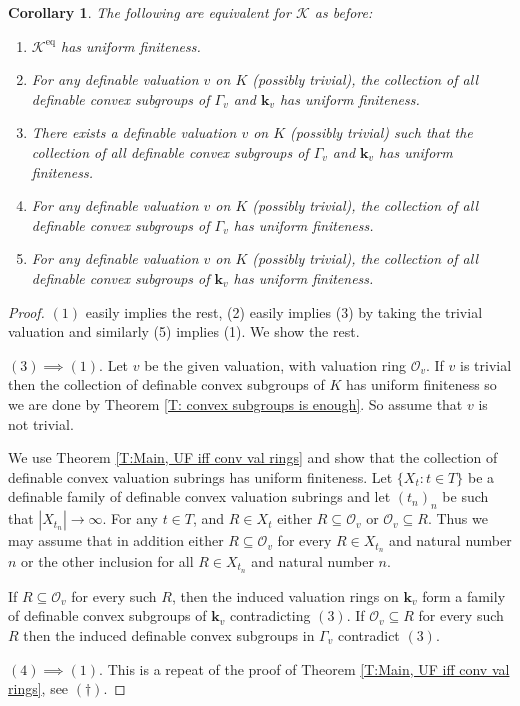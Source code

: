 \documentclass[11pt]{amsart}
\DeclareMathOperator{\eq}{eq}
\newtheorem{corollary}[theorem]{Corollary}
\theoremstyle{definition}
\newcommand{\bk}{\textbf{k}}
\newcommand{\CK}{{\mathcal K}}
\newcommand{\CO}{{\mathcal O}}
\newcommand{\0}{\emptyset}
\begin{document}
\begin{corollary}\label{C: UF for wom valued fields}
The following are equivalent for $\CK$ as before:
\begin{enumerate}
        \item $\CK^{\eq}$ has uniform finiteness.
        
        \item For any definable valuation $v$ on $K$ (possibly trivial), the collection of all definable convex subgroups of $\Gamma_v$ and $\bk_v$ has uniform finiteness. 

        \item There exists a definable valuation $v$ on $K$ (possibly trivial) such that the collection of all definable convex subgroups of $\Gamma_v$ and $\bk_v$ has uniform finiteness. 

        \item For any definable valuation $v$ on $K$ (possibly trivial), the collection of all definable convex subgroups of $\Gamma_v$ has uniform finiteness.

        \item For any definable valuation $v$ on $K$ (possibly trivial), the collection of all definable convex subgroups of $\bk_v$ has uniform finiteness.

\end{enumerate}
\end{corollary}
\begin{proof}
    $(1)$ easily implies the rest, (2) easily implies (3) by taking the trivial valuation and similarly (5) implies (1). We show the rest.

    $(3)\implies (1)$. Let $v$ be the given valuation, with valuation ring $\CO_v$. If $v$ is trivial then the collection of definable convex subgroups of $K$ has uniform finiteness so we are done by Theorem \ref{T: convex subgroups is enough}. So assume that $v$ is not trivial. 
    
    We use Theorem \ref{T:Main, UF iff conv val rings} and show that the collection of definable convex valuation subrings has uniform finiteness. Let $\{X_t: t\in T\}$ be a definable family of definable convex valuation subrings and let $(t_n)_n$ be such that $|X_{t_n}|\to\infty$. For any $t\in T$, and $R\in X_t$ either $R\subseteq \CO_v$ or $\CO_v\subseteq R$. Thus we may assume that in addition  either $R\subseteq \CO_v$ for every $R\in X_{t_n}$ and natural number $n$ or the other inclusion for all $R\in X_{t_n}$ and natural number $n$.

    If $R\subseteq \CO_v$ for every such $R$, then the induced valuation rings on $\bk_v$ form a family of definable convex subgroups of $\bk_v$ contradicting  $(3)$. If $\CO_v\subseteq R$ for every such $R$ then the induced definable convex subgroups in $\Gamma_v$ contradict $(3)$.


    $(4)\implies (1)$. This is a repeat of the proof of Theorem \ref{T:Main, UF iff conv val rings}, see $(\dagger)$.
\end{proof}
\end{document}
